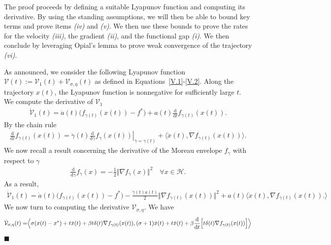 \documentclass[11pt]{article}
\numberwithin{equation}{section}
\newenvironment{proof}{\bigskip\noindent{\bf Proof.}}{\hfill $\blacksquare$ \par\bigskip\noindent}
\begin{document}
\begin{proof}
The proof proceeds by defining a suitable Lyapunov function and computing its derivative. By using the standing assumptions, we will then be able to bound key terms and prove items \textit{(iv)} and \textit{(v)}. We then use these bounds to prove the rates for the velocity \textit{(iii)}, the gradient \textit{(ii)}, and the functional gap \textit{(i)}. We then conclude by leveraging Opial's lemma to prove weak convergence of the trajectory \textit{(vi)}. 

As announced, we consider the following Lyapunov function $\mathcal{V}(t):= \mathcal{V}_1(t) + \mathcal{V}_{\sigma, \eta}(t)$ as defined in Equations~\eqref{V.1}-\eqref{V.2}. Along the trajectory $x(t)$, the Lyapunov function is nonnegative for sufficiently large $t$. We compute the derivative of $\mathcal{V}_1$ \begin{align*}
\dot{\mathcal{V}}_1(t)=\dot{a}(t)\Big(f_{\gamma(t)}(x(t))-f^*\Big)+a(t)\frac{\mathrm{d}}{\mathrm{d}t}f_{\gamma(t)}(x(t)).
\end{align*}
By the chain rule 
\begin{align*}
\frac{\mathrm{d}}{\mathrm{d}t}f_{\gamma(t)}(x(t)) =\dot{\gamma}(t)\left.\frac{\mathrm{d}}{\mathrm{d}\gamma}f_{\gamma}(x(t))\right|_{\gamma=\gamma(t)}+\Big\langle \dot{x}(t),\nabla f_{\gamma(t)}(x(t))
\Big\rangle.
\end{align*}
We now recall a result concerning the derivative of the Moreau envelope $f_{\gamma} $  with respect to $\gamma$ \cite{AttouchCabot2018JDE} 
\begin{align*}
    \frac{\mathrm{d}}{\mathrm{d}\gamma}f_{\gamma}(x)=-\frac{1}{2}\Vert \nabla f_{\gamma}(x) \Vert^2 \quad \forall x \in \mathcal{H.}
\end{align*}
As a result, 
\begin{align}
\label{derivative-lyapunov-first-compo}
\dot{\mathcal{V}}_1(t)=\dot{a}(t)\Big(f_{\gamma(t)}(x(t))-f^*\Big)-\frac{\dot{\gamma}(t)a(t)}{2}\Vert \nabla f_{\gamma(t)}(x(t)) \Vert^2+a(t)\Big\langle \dot{x}(t),\nabla f_{\gamma(t)}(x(t)).
\Big\rangle
\end{align}
We now turn to computing the derivative $\mathcal{V}_{\sigma,\eta}$. We have
\begin{align}  
\label{derivative-lyapunov-opt}
\dot{\mathcal{V}}_{\sigma,\eta}(t)=&\Big \langle \sigma(x(t)-x^*)+t\dot{x}(t)+\beta t\delta(t)\nabla f_{\gamma(t)}(x(t)), (\sigma+1)\dot{x}(t)+t\ddot{x}(t)+\beta\frac{\mathrm{d}}{\mathrm{d}t}\Big[t\delta(t)\nabla f_{\gamma(t)}(x(t))\Big] \Big\rangle \notag\\

\end{align}
\end{proof}
\end{document}
